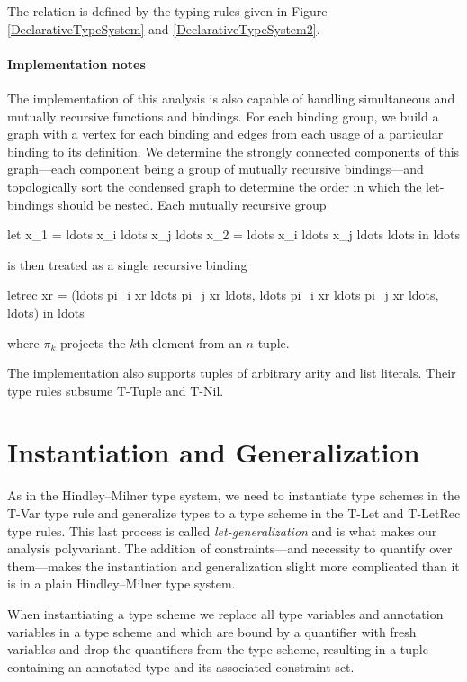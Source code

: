 The relation is defined by the typing rules given in Figure \ref{DeclarativeTypeSystem} and \ref{DeclarativeTypeSystem2}.

\paragraph{Implementation notes} The implementation of this analysis is also capable of handling simultaneous and mutually recursive functions and bindings. For each binding group, we build a graph with a vertex for each binding and edges from each usage of a particular binding to its definition. We determine the strongly connected components of this graph---each component being a group of mutually recursive bindings---and topologically sort the condensed graph to determine the order in which the let-bindings should be nested. Each mutually recursive group
\begin{code}
let  x_1 =  ldots  x_i  ldots  x_j  ldots
     x_2 =  ldots  x_i  ldots  x_j  ldots
     ldots
in   ldots
\end{code}
is then treated as a single recursive binding
\begin{code}
letrec  xr = (ldots pi_i xr ldots pi_j xr ldots, ldots pi_i xr ldots pi_j xr ldots, ldots)
in ldots
\end{code}
where $\pi_k$ projects the $k$th element from an $n$-tuple.

The implementation also supports tuples of arbitrary arity and list literals. Their type rules subsume T-Tuple and T-Nil.

\section{Instantiation and Generalization}

As in the Hindley--Milner type system, we need to instantiate type schemes in the T-Var type rule and generalize types to a type scheme in the T-Let and \mbox{T-LetRec} type rules. This last process is called \emph{let-generalization} and is what makes our analysis polyvariant. The addition of constraints---and necessity to quantify over them---makes the instantiation and generalization slight more complicated than it is in a plain Hindley--Milner type system.

When instantiating a type scheme we replace all type variables and annotation variables in a type scheme and which are bound by a quantifier with fresh variables and drop the quantifiers from the type scheme, resulting in a tuple containing an annotated type and its associated constraint set.

